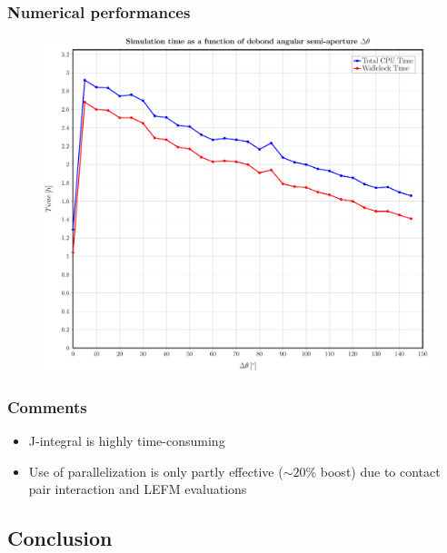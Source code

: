 \documentclass[first,firstsupp,lastsupp,handout,last,hyperref,table]{ETHclass}
\begin{document}
\begin{frame}
\frametitle{\vspace{0.35cm}\scriptsize Numerical performances}
\vspace{-0.85cm}
\begin{figure}
\includegraphics[height=0.9\textheight]{cpus-time.pdf}
\end{figure}
\end{frame}

\begin{frame}
\frametitle{Comments}
\vspace{-0.25cm}
\begin{itemize}[label=]
\item J-integral is highly time-consuming
\item Use of parallelization is only partly effective ($\sim 20\%$ boost) due to contact pair interaction and LEFM evaluations
\end{itemize}
\end{frame}

\subsection{Conclusion}
\end{document}
